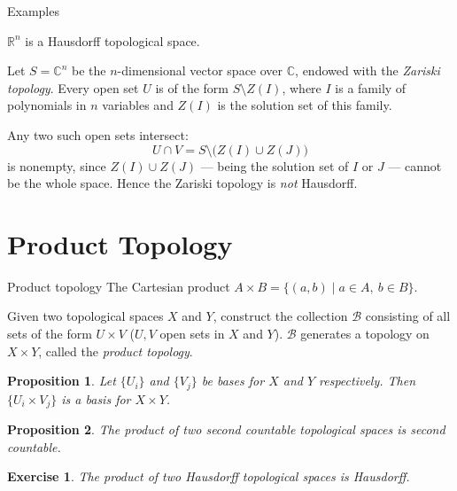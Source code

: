 \documentclass[10pt]{beamer}
\newtheorem{proposition}{Proposition}
\newtheorem{exercise}{Exercise}
\newcommand{\R}{\mathbb{R}}
\newcommand{\C}{\mathbb{C}}
\newcommand{\B}{\mathcal{B}}
\begin{document}
\begin{frame}{Examples}
	\begin{example}
		$\R^n$ is a Hausdorff topological space.
	\end{example}
	\begin{example}
		Let $S = \C^n$ be the $n$-dimensional vector space over $\C$, endowed
		with the \emph{Zariski topology}. Every open set $U$ is of the form
		$S \setminus Z(I)$, where $I$ is a family of polynomials in $n$ variables
		and $Z(I)$ is the solution set of this family.
		\par\smallskip
		Any two such open sets intersect:
		\[
			U \cap V = S \setminus \bigl( Z(I) \cup Z(J) \bigr)
		\]
		is nonempty, since $Z(I) \cup Z(J)$ --- being the solution set of $I$ or
		$J$ --- cannot be the whole space. Hence the Zariski topology is
		\emph{not} Hausdorff.
	\end{example}
\end{frame}

\section{Product Topology}

\begin{frame}{Product topology}
	The Cartesian product $A \times B = \{(a,b) \mid a \in A,\ b \in B\}$.
	\begin{definition}
		Given two topological spaces $X$ and $Y$, construct the collection $\B$
		consisting of all sets of the form $U \times V$ ($U, V$ open sets in $X$
		and $Y$). $\B$ generates a topology on $X \times Y$, called the
		\emph{product topology}.
	\end{definition}
	\begin{proposition}
		Let $\{U_i\}$ and $\{V_j\}$ be bases for $X$ and $Y$ respectively. Then
		$\{U_i \times V_j\}$ is a basis for $X \times Y$.
	\end{proposition}
	\begin{proposition}
		The product of two second countable topological spaces is second
		countable.
	\end{proposition}
	\begin{exercise}
		The product of two Hausdorff topological spaces is Hausdorff.
	\end{exercise}
\end{frame}

\end{document}
